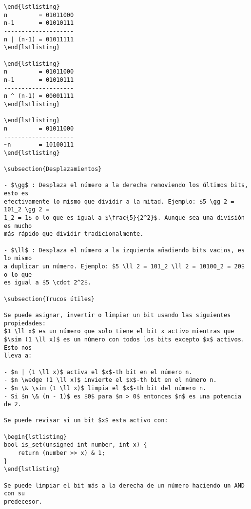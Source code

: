 \documentclass[11pt]{article}
\begin{document}
\begin{verbatim}
\end{lstlisting}
n         = 01011000
n-1       = 01010111
--------------------
n | (n-1) = 01011111
\end{lstlisting}

\end{lstlisting}
n         = 01011000
n-1       = 01010111
--------------------
n ^ (n-1) = 00001111
\end{lstlisting}

\end{lstlisting}
n         = 01011000
--------------------
~n        = 10100111
\end{lstlisting}

\subsection{Desplazamientos}

- $\gg$ : Desplaza el número a la derecha removiendo los últimos bits, esto es
efectivamente lo mismo que dividir a la mitad. Ejemplo: $5 \gg 2 = 101_2 \gg 2 =
1_2 = 1$ o lo que es igual a $\frac{5}{2^2}$. Aunque sea una división es mucho
más rápido que dividir tradicionalmente.

- $\ll$ : Desplaza el número a la izquierda añadiendo bits vacios, es lo mismo
a duplicar un número. Ejemplo: $5 \ll 2 = 101_2 \ll 2 = 10100_2 = 20$ o lo que
es igual a $5 \cdot 2^2$.

\subsection{Trucos útiles}

Se puede asignar, invertir o limpiar un bit usando las siguientes propiedades:
$1 \ll x$ es un número que solo tiene el bit x activo mientras que
$\sim (1 \ll x)$ es un número con todos los bits excepto $x$ activos. Esto nos
lleva a:

- $n | (1 \ll x)$ activa el $x$-th bit en el número n.
- $n \wedge (1 \ll x)$ invierte el $x$-th bit en el número n.
- $n \& \sim (1 \ll x)$ limpia el $x$-th bit del número n.
- Si $n \& (n - 1)$ es $0$ para $n > 0$ entonces $n$ es una potencia de 2.

Se puede revisar si un bit $x$ esta activo con:

\begin{lstlisting}
bool is_set(unsigned int number, int x) {
    return (number >> x) & 1;
}
\end{lstlisting}

Se puede limpiar el bit más a la derecha de un número haciendo un AND con su
predecesor.
 

\end{verbatim}
\end{document}
